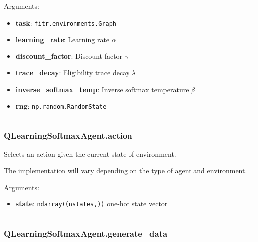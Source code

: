 Arguments:

\begin{itemize}
\tightlist
\item
  \textbf{task}: \texttt{fitr.environments.Graph}
\item
  \textbf{learning\_rate}: Learning rate \(\alpha\)
\item
  \textbf{discount\_factor}: Discount factor \(\gamma\)
\item
  \textbf{trace\_decay}: Eligibility trace decay \(\lambda\)
\item
  \textbf{inverse\_softmax\_temp}: Inverse softmax temperature \(\beta\)
\item
  \textbf{rng}: \texttt{np.random.RandomState}
\end{itemize}

\begin{center}\rule{0.5\linewidth}{\linethickness}\end{center}

\hypertarget{qlearningsoftmaxagent.action}{%
\subsubsection{QLearningSoftmaxAgent.action}\label{qlearningsoftmaxagent.action}}

\begin{Shaded}
\begin{Highlighting}[]
\end{Highlighting}
\end{Shaded}

Selects an action given the current state of environment.

The implementation will vary depending on the type of agent and
environment.

Arguments:

\begin{itemize}
\tightlist
\item
  \textbf{state}: \texttt{ndarray((nstates,))} one-hot state vector
\end{itemize}

\begin{center}\rule{0.5\linewidth}{\linethickness}\end{center}

\hypertarget{qlearningsoftmaxagent.generate_data}{%
\subsubsection{QLearningSoftmaxAgent.generate\_data}\label{qlearningsoftmaxagent.generate_data}}

